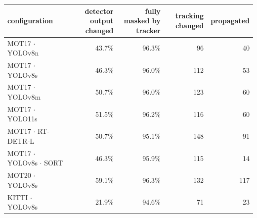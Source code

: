 \begin{tabular}{lrrrr}
\toprule
configuration & detector output changed & fully masked by tracker & tracking changed & propagated \\
\midrule
MOT17 $\cdot$ YOLOv8n & 43.7\% & 96.3\% & 96 & 40 \\
MOT17 $\cdot$ YOLOv8s & 46.3\% & 96.0\% & 112 & 53 \\
MOT17 $\cdot$ YOLOv8m & 50.7\% & 96.0\% & 123 & 60 \\
MOT17 $\cdot$ YOLO11s & 51.5\% & 96.2\% & 116 & 60 \\
MOT17 $\cdot$ RT-DETR-L & 50.7\% & 95.1\% & 148 & 91 \\
MOT17 $\cdot$ YOLOv8s $\cdot$ SORT & 46.3\% & 95.9\% & 115 & 14 \\
MOT20 $\cdot$ YOLOv8s & 59.1\% & 96.3\% & 132 & 117 \\
KITTI $\cdot$ YOLOv8s & 21.9\% & 94.6\% & 71 & 23 \\
\bottomrule
\end{tabular}
